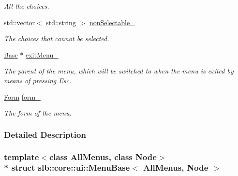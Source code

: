 \begin{DoxyCompactItemize}
\begin{DoxyCompactList}\small\item\em All the choices. \end{DoxyCompactList}\item 
std\+::vector$<$ std\+::string $>$ \hyperlink{structslb_1_1core_1_1ui_1_1MenuBase_a18e8015c60668cfc582c40a2bba461cc}{non\+Selectable\+\_\+}\hypertarget{structslb_1_1core_1_1ui_1_1MenuBase_a18e8015c60668cfc582c40a2bba461cc}{}\label{structslb_1_1core_1_1ui_1_1MenuBase_a18e8015c60668cfc582c40a2bba461cc}

\begin{DoxyCompactList}\small\item\em The choices that cannot be selected. \end{DoxyCompactList}\item 
\hyperlink{structslb_1_1core_1_1ui_1_1MenuBase_a766bcf66d6b83992085bad43a4455585}{Base} $\ast$ \hyperlink{structslb_1_1core_1_1ui_1_1MenuBase_ac60a1fbe29a6ce4abe7c0a936f470828}{exit\+Menu\+\_\+}\hypertarget{structslb_1_1core_1_1ui_1_1MenuBase_ac60a1fbe29a6ce4abe7c0a936f470828}{}\label{structslb_1_1core_1_1ui_1_1MenuBase_ac60a1fbe29a6ce4abe7c0a936f470828}

\begin{DoxyCompactList}\small\item\em The parent of the menu, which will be switched to when the menu is exited by means of pressing Esc. \end{DoxyCompactList}\item 
\hyperlink{structslb_1_1core_1_1ui_1_1Form}{Form} \hyperlink{structslb_1_1core_1_1ui_1_1MenuBase_ad33d49ddd3e91cdf254aa80daacc8466}{form\+\_\+}\hypertarget{structslb_1_1core_1_1ui_1_1MenuBase_ad33d49ddd3e91cdf254aa80daacc8466}{}\label{structslb_1_1core_1_1ui_1_1MenuBase_ad33d49ddd3e91cdf254aa80daacc8466}

\begin{DoxyCompactList}\small\item\em The form of the menu. \end{DoxyCompactList}\end{DoxyCompactItemize}


\subsubsection{Detailed Description}
\subsubsection*{template$<$class All\+Menus, class Node$>$\\*
struct slb\+::core\+::ui\+::\+Menu\+Base$<$ All\+Menus, Node $>$}

